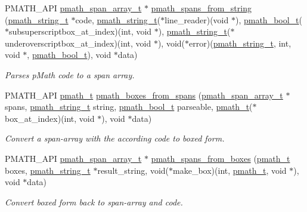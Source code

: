 \begin{CompactItemize}
\item 
PMATH\_\-API \hyperlink{classpmath__span__array__t}{pmath\_\-span\_\-array\_\-t} $\ast$ \hyperlink{group__parser_g877ac507e27c8791a265105f796f3cef}{pmath\_\-spans\_\-from\_\-string} (\hyperlink{classpmath__string__t}{pmath\_\-string\_\-t} $\ast$code, \hyperlink{classpmath__string__t}{pmath\_\-string\_\-t}($\ast$line\_\-reader)(void $\ast$), \hyperlink{group__general__types_gc92090cb0b56345d6c379ed2341d4ef4}{pmath\_\-bool\_\-t}($\ast$subsuperscriptbox\_\-at\_\-index)(int, void $\ast$), \hyperlink{classpmath__string__t}{pmath\_\-string\_\-t}($\ast$underoverscriptbox\_\-at\_\-index)(int, void $\ast$), void($\ast$error)(\hyperlink{classpmath__string__t}{pmath\_\-string\_\-t}, int, void $\ast$, \hyperlink{group__general__types_gc92090cb0b56345d6c379ed2341d4ef4}{pmath\_\-bool\_\-t}), void $\ast$data)
\begin{CompactList}\small\item\em Parses pMath code to a span array. \item\end{CompactList}\item 
PMATH\_\-API \hyperlink{classpmath__t}{pmath\_\-t} \hyperlink{group__parser_g2c9c96d98401746a9f19d7dc52255e0f}{pmath\_\-boxes\_\-from\_\-spans} (\hyperlink{classpmath__span__array__t}{pmath\_\-span\_\-array\_\-t} $\ast$spans, \hyperlink{classpmath__string__t}{pmath\_\-string\_\-t} string, \hyperlink{group__general__types_gc92090cb0b56345d6c379ed2341d4ef4}{pmath\_\-bool\_\-t} parseable, \hyperlink{classpmath__t}{pmath\_\-t}($\ast$box\_\-at\_\-index)(int, void $\ast$), void $\ast$data)
\begin{CompactList}\small\item\em Convert a span-array with the according code to boxed form. \item\end{CompactList}\item 
PMATH\_\-API \hyperlink{classpmath__span__array__t}{pmath\_\-span\_\-array\_\-t} $\ast$ \hyperlink{group__parser_g9914e557782a4c7ff312b2b474fcf045}{pmath\_\-spans\_\-from\_\-boxes} (\hyperlink{classpmath__t}{pmath\_\-t} boxes, \hyperlink{classpmath__string__t}{pmath\_\-string\_\-t} $\ast$result\_\-string, void($\ast$make\_\-box)(int, \hyperlink{classpmath__t}{pmath\_\-t}, void $\ast$), void $\ast$data)
\begin{CompactList}\small\item\em Convert boxed form back to span-array and code. \item\end{CompactList}\item 

\end{CompactItemize}
